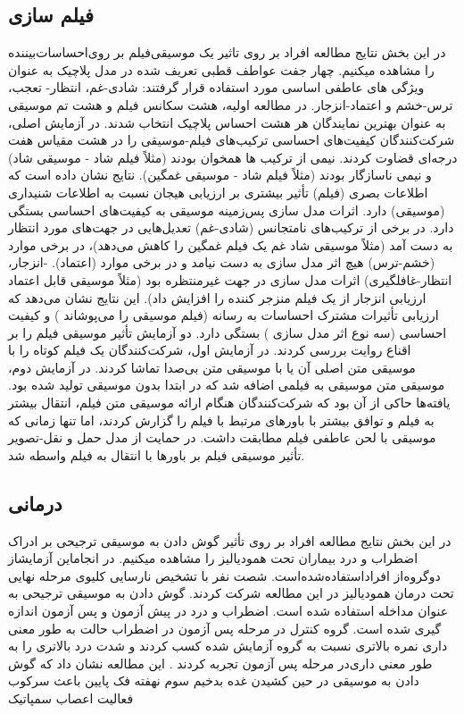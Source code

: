 \subsection{فیلم سازی}
در این بخش نتایج مطالعه افراد بر روی تاثیر یک موسیقی‌فیلم بر روی‌احساسات‌بیننده را مشاهده میکنیم.  چهار جفت عواطف قطبی تعریف شده در مدل پلاچیک به عنوان ویژگی های عاطفی اساسی مورد استفاده قرار گرفتند: شادی-غم،  انتظار- تعجب،  ترس-خشم و اعتماد-انزجار.  در مطالعه اولیه، هشت سکانس فیلم و هشت تم موسیقی به عنوان بهترین نمایندگان هر هشت احساس پلاچیک انتخاب شدند.  در آزمایش اصلی،  شرکت‌کنندگان کیفیت‌های احساسی ترکیب‌های فیلم-موسیقی را در هشت مقیاس هفت درجه‌ای قضاوت کردند.  نیمی از ترکیب ها همخوان بودند (مثلاً فیلم شاد - موسیقی شاد) و نیمی ناسازگار بودند (مثلاً فیلم شاد - موسیقی غمگین).  نتایج نشان داده است که اطلاعات بصری (فیلم) تأثیر بیشتری بر ارزیابی هیجان نسبت به اطلاعات شنیداری (موسیقی) دارد.  اثرات مدل سازی  پس‌زمینه موسیقی به کیفیت‌های احساسی بستگی دارد.  در برخی از ترکیب‌های نامتجانس (شادی-غم) تعدیل‌هایی در جهت‌های مورد انتظار به دست آمد (مثلاً موسیقی شاد غم یک فیلم غمگین را کاهش می‌دهد)، در برخی موارد (خشم-ترس) هیچ اثر مدل سازی به دست نیامد و در برخی موارد (اعتماد). -انزجار، انتظار-غافلگیری) اثرات مدل سازی  در جهت غیرمنتظره بود (مثلاً موسیقی قابل اعتماد ارزیابی انزجار از یک فیلم منزجر کننده را افزایش داد). این نتایج نشان می‌دهد که ارزیابی تأثیرات مشترک احساسات به رسانه (فیلم موسیقی را می‌پوشاند ) و کیفیت احساسی (سه نوع اثر مدل سازی ) بستگی دارد. 
دو آزمایش تأثیر موسیقی فیلم را بر اقناع روایت بررسی کردند.  در آزمایش اول،  شرکت‌کنندگان یک فیلم کوتاه را با موسیقی متن اصلی آن یا با موسیقی متن بی‌صدا تماشا کردند. در آزمایش دوم،  موسیقی متن موسیقی به فیلمی اضافه شد که در ابتدا بدون موسیقی تولید شده بود.  یافته‌ها حاکی از آن بود که شرکت‌کنندگان هنگام ارائه موسیقی متن فیلم، انتقال بیشتر به فیلم و توافق بیشتر با باورهای مرتبط با فیلم را گزارش کردند، اما تنها زمانی که موسیقی با لحن عاطفی فیلم مطابقت داشت. در حمایت از مدل حمل و نقل-تصویر
 تأثیر موسیقی فیلم بر باورها با انتقال به فیلم واسطه شد.
\cite{costabile2013effects,pavlovic2011effect}
\subsection{درمانی}
در این بخش نتایج مطالعه افراد بر روی تأثیر گوش دادن به موسیقی ترجیحی بر ادراک اضطراب و درد بیماران تحت همودیالیز را مشاهده میکنیم. در انجام‍این آزمایش‍از دو‌گروه‌از افراد‌استفاده‌شده‌است.  شصت نفر با تشخیص نارسایی کلیوی مرحله نهایی تحت درمان همودیالیز در این مطالعه شرکت کردند.  گوش دادن به موسیقی ترجیحی به عنوان مداخله استفاده شده است.  اضطراب و درد در پیش آزمون و پس آزمون اندازه گیری شده است. گروه کنترل در مرحله پس آزمون در اضطراب حالت به طور معنی داری نمره بالاتری نسبت به گروه آزمایش شده کسب کردند و شدت درد بالاتری را به طور معنی داری‌در مرحله پس آزمون تجربه کردند . 
این مطالعه نشان داد که گوش دادن به موسیقی در حین کشیدن غده بدخیم سوم نهفته فک پایین باعث سرکوب فعالیت اعصاب سمپاتیک 

